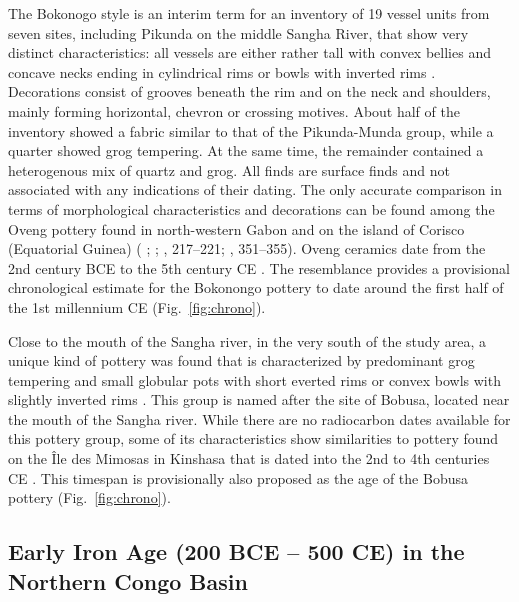 \documentclass[smallextended,natbib]{svjour3}       %
\begin{document}
The Bokonogo style is an interim term for an inventory of 19 vessel units from seven sites, including Pikunda on the middle Sangha River, that show very distinct characteristics: all vessels are either rather tall with convex bellies and concave necks ending in cylindrical rims or bowls with inverted rims \citep[Fig.~\ref{fig:sangha}.4;][120--123]{Seidensticker.2021e}. Decorations consist of grooves beneath the rim and on the neck and shoulders, mainly forming horizontal, chevron or crossing motives. About half of the inventory showed a fabric similar to that of the Pikunda-Munda group, while a quarter showed grog tempering. At the same time, the remainder contained a heterogenous mix of quartz and grog. All finds are surface finds and not associated with any indications of their dating. The only accurate comparison in terms of morphological characteristics and decorations can be found among the Oveng pottery found in north-western Gabon \citep[615--618]{Clist.20042005} and on the island of Corisco (Equatorial Guinea) (\citeauthor{GonzalezRuibal.2011} \citeyear{GonzalezRuibal.2011}; \citeyear{GonzalesRuibal.2012}; \citeauthor{SanchezElipe.2015} \citeyear{SanchezElipe.2015}, 217--221; \citeauthor{SanchezElipe.2016} \citeyear{SanchezElipe.2016}, 351--355). Oveng ceramics date from the 2nd century BCE to the 5th century CE \citep[555 Fig. 7–14]{Clist.20042005}. The resemblance provides a provisional chronological estimate for the Bokonongo pottery to date around the first half of the 1st millennium CE (Fig.~\ref{fig:chrono}).

Close to the mouth of the Sangha river, in the very south of the study area, a unique kind of pottery was found that is characterized by predominant grog tempering and small globular pots with short everted rims or convex bowls with slightly inverted rims \citep[Fig.~\ref{fig:sangha}.5--7;][162--165]{Seidensticker.2021e}. This group is named after the site of Bobusa, located near the mouth of the Sangha river. While there are no radiocarbon dates available for this pottery group, some of its characteristics show similarities to pottery found on the Île des Mimosas in Kinshasa that is dated into the 2nd to 4th centuries CE \citep[279--280]{Eggert.1984}. This timespan is provisionally also proposed as the age of the Bobusa pottery (Fig.~\ref{fig:chrono}).

\subsection*{Early Iron Age (200 BCE – 500 CE) in the Northern Congo Basin}
\end{document}
